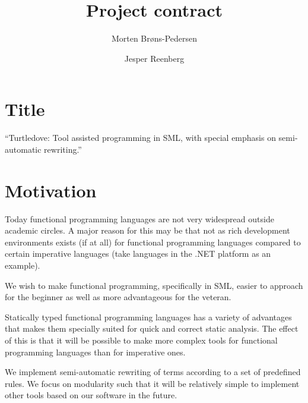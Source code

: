\documentclass[a4paper,oneside,final]{article}
\author{Morten Brøns-Pedersen \and Jesper Reenberg}
\title{Project contract}
\begin{document}
\maketitle


\section{Title} ``Turtledove: Tool assisted programming in SML, with special
emphasis on semi-automatic rewriting.''

\section{Motivation}
Today functional programming languages are not very widespread outside academic
circles. A major reason for this may be that not as rich development
environments exists (if at all) for functional programming languages compared to
certain imperative languages (take languages in the .NET platform as an
example).

We wish to make functional programming, specifically in SML, easier to approach
for the beginner as well as more advantageous for the veteran.

Statically typed functional programming languages has a variety of advantages
that makes them specially suited for quick and correct static analysis. The
effect of this is that it will be possible to make more complex tools for
functional programming languages than for imperative ones.

We implement semi-automatic rewriting of terms according to a set of predefined
rules. We focus on modularity such that it will be relatively simple to
implement other tools based on our software in the future.


\end{document}
